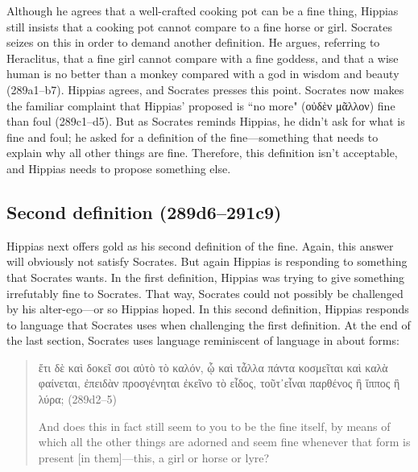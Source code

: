 \documentclass[11pt]{article}
\begin{document}
Although he agrees that a well-crafted cooking pot can be a fine thing, Hippias
still insists that a cooking pot cannot compare to a fine horse or girl.
Socrates seizes on this in order to demand another definition.  He argues,
referring to Heraclitus, that a fine girl cannot compare with a fine goddess,
and that a wise human is no better than a monkey compared with a god in wisdom
and beauty (289a1--b7).  Hippias agrees, and Socrates presses this point.
Socrates now makes the familiar complaint that Hippias' proposed
 is ``no more" ({\g οὐδὲν μᾶλλον}) fine than foul
(289c1--d5).  But as Socrates reminds Hippias, he didn't ask for what is fine
and foul; he asked for a definition of the fine---something that needs to
explain why all other things are fine.  Therefore, this definition isn't
acceptable, and Hippias needs to propose something else.


\subsection{Second definition (289d6--291c9)}

Hippias next offers gold as his second definition of the fine.  Again, this
answer will obviously not satisfy Socrates.  But again Hippias is responding to
something that Socrates wants.  In the first definition, Hippias was trying to
give something irrefutably fine to Socrates.  That way, Socrates could not
possibly be challenged by his alter-ego---or so Hippias hoped.  In this second
definition, Hippias responds to language that Socrates uses when challenging
the first definition. At the end of the last section, Socrates uses language
reminiscent of language in  about forms:

\begin{quote}

    {\g ἔτι δὲ καὶ δοκεῖ σοι αὐτὸ τὸ καλόν, ᾧ καὶ τἆλλα πάντα κοσμεῖται καὶ
    καλὰ φαίνεται, ἐπειδὰν προσγένηται ἐκεῖνο τὸ εἶδος, τοῦτ᾽εἶναι παρθένος
    ἢ ἵππος ἢ λύρα;} (289d2--5)

    And does this in fact still seem to you to be the fine itself, by means of
    which all the other things are adorned and seem fine whenever that form is
    present [in them]---this, a girl or horse or lyre?

\end{quote}
\end{document}
